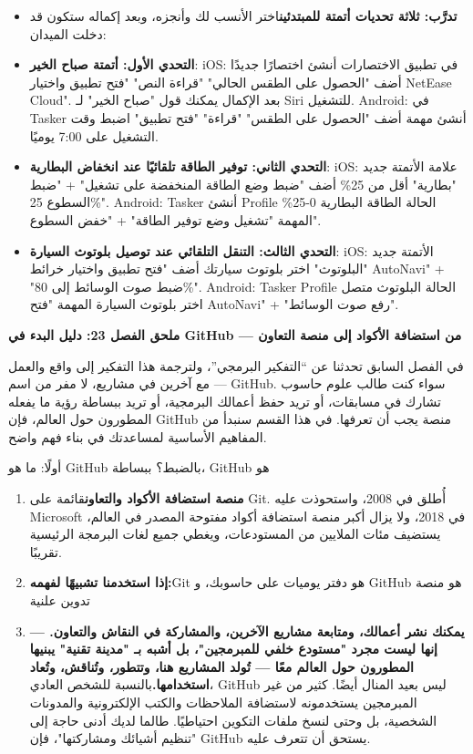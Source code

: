 \begin{itemize}
  \item \textbf{تدرَّب: ثلاثة تحديات أتمتة للمبتدئين}اختر الأنسب لك وأنجزه، وبعد إكماله ستكون قد دخلت الميدان:
  \item \textbf{التحدي الأول: أتمتة صباح الخير}: iOS: في تطبيق الاختصارات أنشئ اختصارًا جديدًا أضف "الحصول على الطقس الحالي" "قراءة النص" "فتح تطبيق واختيار NetEase Cloud". بعد الإكمال يمكنك قول "صباح الخير" لـ Siri للتشغيل. Android: في Tasker أنشئ مهمة أضف "الحصول على الطقس" "قراءة" "فتح تطبيق" اضبط وقت التشغيل على 7:00 يوميًا.
  \item \textbf{التحدي الثاني: توفير الطاقة تلقائيًا عند انخفاض البطارية}: iOS: علامة الأتمتة جديد "بطارية" أقل من 25\% أضف "ضبط وضع الطاقة المنخفضة على تشغيل" + "ضبط السطوع 25\%". Android: Tasker أنشئ Profile الحالة الطاقة البطارية 0-25\% المهمة "تشغيل وضع توفير الطاقة" + "خفض السطوع".
  \item \textbf{التحدي الثالث: التنقل التلقائي عند توصيل بلوتوث السيارة}: iOS: الأتمتة جديد "البلوتوث" اختر بلوتوث سيارتك أضف "فتح تطبيق واختيار خرائط AutoNavi" + "ضبط صوت الوسائط إلى 80\%". Android: Tasker Profile الحالة البلوتوث متصل اختر بلوتوث السيارة المهمة "فتح AutoNavi" + "رفع صوت الوسائط".
\end{itemize}

\textbf{ملحق الفصل 23: دليل البدء في GitHub — من استضافة الأكواد إلى منصة التعاون}\par

في الفصل السابق تحدثنا عن “التفكير البرمجي”، ولترجمة هذا التفكير إلى واقع والعمل مع آخرين في مشاريع، لا مفر من اسم — GitHub. سواء كنت طالب علوم حاسوب تشارك في مسابقات، أو تريد حفظ أعمالك البرمجية، أو تريد ببساطة رؤية ما يفعله المطورون حول العالم، فإن GitHub منصة يجب أن تعرفها. في هذا القسم سنبدأ من المفاهيم الأساسية لمساعدتك في بناء فهم واضح.

\begin{tcbpractice}{أولًا: ما هو GitHub بالضبط؟}
ببساطة، GitHub هو

\begin{enumerate}
  \item \textbf{منصة استضافة الأكواد والتعاون}قائمة على Git. أُطلق في 2008، واستحوذت عليه Microsoft في 2018، ولا يزال أكبر منصة استضافة أكواد مفتوحة المصدر في العالم، يستضيف مئات الملايين من المستودعات، ويغطي جميع لغات البرمجة الرئيسية تقريبًا.
  \item \textbf{إذا استخدمنا تشبيهًا لفهمه:}Git هو دفتر يوميات على حاسوبك، و GitHub هو منصة تدوين علنية
  \item \textbf{— يمكنك نشر أعمالك، ومتابعة مشاريع الآخرين، والمشاركة في النقاش والتعاون. إنها ليست مجرد "مستودع خلفي للمبرمجين"، بل أشبه بـ "مدينة تقنية" يبنيها المطورون حول العالم معًا — تُولد المشاريع هنا، وتتطور، وتُناقش، وتُعاد استخدامها.}بالنسبة للشخص العادي، GitHub ليس بعيد المنال أيضًا. كثير من غير المبرمجين يستخدمونه لاستضافة الملاحظات والكتب الإلكترونية والمدونات الشخصية، بل وحتى لنسخ ملفات التكوين احتياطيًا. طالما لديك أدنى حاجة إلى "تنظيم أشيائك ومشاركتها"، فإن GitHub يستحق أن تتعرف عليه.
\end{enumerate}

\end{tcbpractice}

